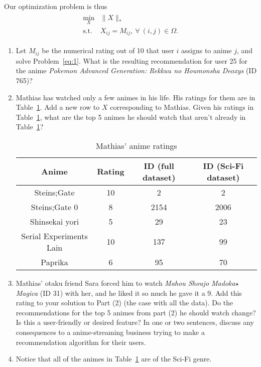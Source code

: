 \documentclass[11pt,a4paper]{article}
\begin{document}
Our optimization problem is thus
\begin{align}
  \begin{array}{ll}
    \min_{X} & \|X\|_*\\
    \mathrm{s.t.} & X_{ij} = M_{ij},~\forall~(i,j)\in \Omega.
  \end{array}\label{eq:1} \tag{P1}
\end{align}


\begin{enumerate}
  \item Let $M_{ij}$ be the numerical rating out of 10 that user $i$ assigns to anime $j$, and solve Problem~\eqref{eq:1}.
    What is the resulting recommendation for user 25 for the anime \textit{Pokemon Advanced Generation: Rekkuu no Houmonsha Deoxys} (ID 765)?
  \item Mathias has watched only a few animes in his life. His ratings for them are in Table~\ref{tab:anime}.
    Add a new row to $X$ corresponding to Mathias.
    Given his ratings in Table~\ref{tab:anime}, what are the top 5 animes he should watch that aren't already in Table~\ref{tab:anime}?
    \begin{table}
      \centering
      \begin{tabular}{||c|c|c|c||}\hline
        Anime & Rating & ID (full dataset) & ID (Sci-Fi dataset)\\\hline\hline
        Steins;Gate & 10 & 2 & 2\\\hline
        Steins;Gate 0& 8 & 2154 & 2006\\\hline
        Shinsekai yori & 5& 29 & 23 \\\hline
        Serial Experiments Lain & 10 & 137 & 99 \\\hline
        Paprika & 6 & 95 & 70\\\hline
      \end{tabular}
      \caption{Mathias' anime ratings}
      \label{tab:anime}
    \end{table}
  \item Mathias' otaku friend Sara forced him to watch \emph{Mahou Shoujo Madoka$\star$Magica} (ID 31) with her, and he liked it so much he gave it a 9. Add this rating to your solution to Part (2) (the case with all the data).
  Do the recommendations for the top 5 animes from part (2) he should watch change?
  Is this a user-friendly or desired feature?
  In one or two sentences, discuss any consequences to a anime-streaming business trying to make a recommendation algorithm for their users.
 \item Notice that all of the animes in Table~\ref{tab:anime} are of the Sci-Fi genre.

\end{enumerate}
\end{document}
